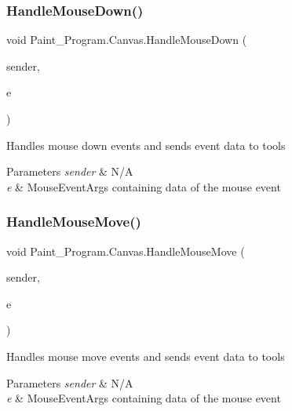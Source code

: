 \subsubsection{\texorpdfstring{Handle\+Mouse\+Down()}{HandleMouseDown()}}
{\footnotesize\ttfamily void Paint\+\_\+\+Program.\+Canvas.\+Handle\+Mouse\+Down (\begin{DoxyParamCaption}\item[{object}]{sender,  }\item[{Mouse\+Event\+Args}]{e }\end{DoxyParamCaption})\hspace{0.3cm}{\ttfamily [inline]}}



Handles mouse down events and sends event data to tools 


\begin{DoxyParams}{Parameters}
{\em sender} & N/A\\
\hline
{\em e} & Mouse\+Event\+Args containing data of the mouse event\\
\hline
\end{DoxyParams}
\mbox{\label{class_paint___program_1_1_canvas_a469df114198596cb65df4a22fcabc685}} 
\subsubsection{\texorpdfstring{Handle\+Mouse\+Move()}{HandleMouseMove()}}
{\footnotesize\ttfamily void Paint\+\_\+\+Program.\+Canvas.\+Handle\+Mouse\+Move (\begin{DoxyParamCaption}\item[{object}]{sender,  }\item[{Mouse\+Event\+Args}]{e }\end{DoxyParamCaption})\hspace{0.3cm}{\ttfamily [inline]}}



Handles mouse move events and sends event data to tools 


\begin{DoxyParams}{Parameters}
{\em sender} & N/A\\
\hline
{\em e} & Mouse\+Event\+Args containing data of the mouse event\\
\hline
\end{DoxyParams}
\mbox{\label{class_paint___program_1_1_canvas_a9e3612510a869438dad1e5bd0ec3870e}} 
